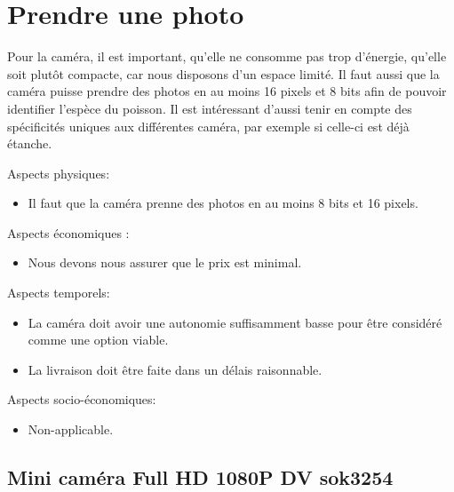 \section{Prendre une photo}
	
	Pour la caméra, il est important, qu’elle ne consomme pas trop d’énergie, qu’elle soit plutôt compacte, car nous disposons d’un espace limité. Il faut aussi que la caméra puisse prendre des photos en au moins 16 pixels et 8 bits afin de pouvoir identifier l’espèce du poisson. Il est intéressant d’aussi tenir en compte des spécificités uniques aux différentes caméra, par exemple si celle-ci est déjà étanche.
	
	Aspects physiques:
	\begin{itemize}
		
		\item Il faut que la caméra prenne des photos en au moins 8 bits et 16 pixels.
		
	\end{itemize}
	
	Aspects économiques :
	
	\begin{itemize}
		
		\item Nous devons nous assurer que le prix est minimal.
		
	\end{itemize}
	
	Aspects temporels:
	
	\begin{itemize}
		\item La caméra doit avoir une autonomie suffisamment basse pour être considéré comme une option viable.		
		\item La livraison doit être faite dans un délais raisonnable.
	\end{itemize}

	Aspects socio-économiques:
	\begin{itemize}
	\item Non-applicable.
	\end{itemize}
	
	\subsection{Mini caméra Full HD 1080P DV sok3254}
	

